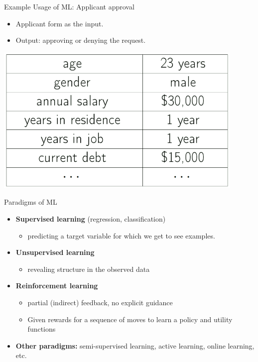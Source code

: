 \documentclass[serif, aspectratio=169]{beamer}
\begin{document}
\begin{frame}{Example Usage of ML: Applicant approval}
    \begin{minipage}{0.5\textwidth}
        \begin{itemize}
            \item Applicant form as the input.
            \item Output: approving or denying the request.
        \end{itemize}
    \end{minipage}%
    \begin{minipage}{0.5\textwidth}
        \centering
        \includegraphics[width=0.9\textwidth]{pic/3.png}
    \end{minipage}
\end{frame}

\begin{frame}{Paradigms of ML}

\begin{itemize}
    \item \textbf{Supervised learning} (regression, classification)
    \begin{itemize}
        \item predicting a target variable for which we get to see examples.
    \end{itemize}
    \item \textbf{Unsupervised learning}
    \begin{itemize}
        \item revealing structure in the observed data
    \end{itemize}
    \item \textbf{Reinforcement learning}
    \begin{itemize}
        \item partial (indirect) feedback, no explicit guidance
        \item Given rewards for a sequence of moves to learn a policy and utility functions
    \end{itemize}
    \item \textbf{Other paradigms:} semi-supervised learning, active learning, online learning, etc.
\end{itemize}

\end{frame}
\end{document}
